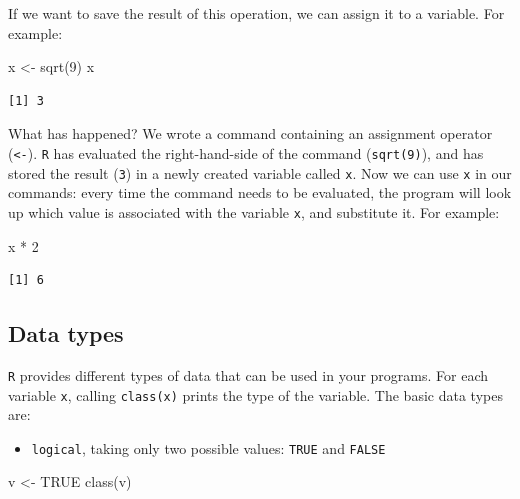 \documentclass[
  letterpaper,
  DIV=11,
  numbers=noendperiod]{scrreprt}
\newenvironment{Shaded}{\begin{snugshade}}{\end{snugshade}}
\newcommand{\ConstantTok}[1]{\textcolor[rgb]{0.56,0.35,0.01}{#1}}
\newcommand{\DecValTok}[1]{\textcolor[rgb]{0.68,0.00,0.00}{#1}}
\newcommand{\FunctionTok}[1]{\textcolor[rgb]{0.28,0.35,0.67}{#1}}
\newcommand{\NormalTok}[1]{\textcolor[rgb]{0.00,0.23,0.31}{#1}}
\newcommand{\OtherTok}[1]{\textcolor[rgb]{0.00,0.23,0.31}{#1}}
\newcommand{\SpecialCharTok}[1]{\textcolor[rgb]{0.37,0.37,0.37}{#1}}
\providecommand{\tightlist}{%
  \setlength{\itemsep}{0pt}\setlength{\parskip}{0pt}}\usepackage{longtable,booktabs,array}
\begin{document}
If we want to save the result of this operation, we can assign it to a
variable. For example:

\begin{Shaded}
\begin{Highlighting}[]
\NormalTok{x }\OtherTok{\textless{}{-}} \FunctionTok{sqrt}\NormalTok{(}\DecValTok{9}\NormalTok{)}
\NormalTok{x}
\end{Highlighting}
\end{Shaded}

\begin{verbatim}
[1] 3
\end{verbatim}

What has happened? We wrote a command containing an assignment operator
(\texttt{\textless{}-}). \texttt{R} has evaluated the right-hand-side of
the command (\texttt{sqrt(9)}), and has stored the result (\texttt{3})
in a newly created variable called \texttt{x}. Now we can use \texttt{x}
in our commands: every time the command needs to be evaluated, the
program will look up which value is associated with the variable
\texttt{x}, and substitute it. For example:

\begin{Shaded}
\begin{Highlighting}[]
\NormalTok{x }\SpecialCharTok{*} \DecValTok{2} 
\end{Highlighting}
\end{Shaded}

\begin{verbatim}
[1] 6
\end{verbatim}

\hypertarget{data-types}{%
\subsection{Data types}\label{data-types}}

\texttt{R} provides different types of data that can be used in your
programs. For each variable \texttt{x}, calling \texttt{class(x)} prints
the type of the variable. The basic data types are:

\begin{itemize}
\tightlist
\item
  \texttt{logical}, taking only two possible values: \texttt{TRUE} and
  \texttt{FALSE}
\end{itemize}

\begin{Shaded}
\begin{Highlighting}[]
\NormalTok{v }\OtherTok{\textless{}{-}} \ConstantTok{TRUE}
\FunctionTok{class}\NormalTok{(v)}
\end{Highlighting}
\end{Shaded}
\end{document}
